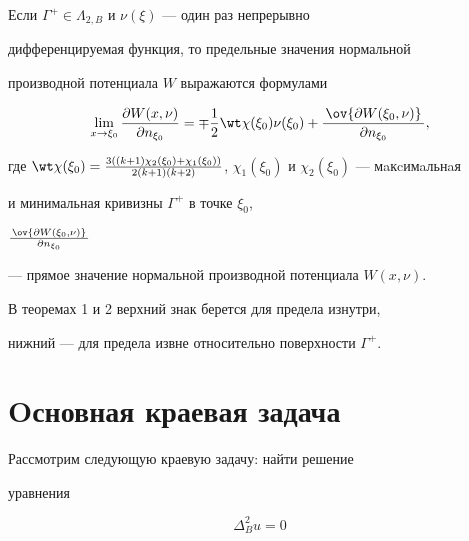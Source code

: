  


\begin{thm} 


Если $\Gamma^+\in\Lambda_{2,B}$ и $\nu(\xi)$ --- один раз непрерывно 


дифференцируемая функция, то предельные значения нормальной 


производной потенциала $W$ выражаются формулами 


\begin{equation} 


\lim_{x\to\xi_0}\frac{\partial W(x,\nu)}{\partial n_{\xi_0}}= 


\mp\frac{1}{2}\wt\chi(\xi_0)\nu(\xi_0)+ 


\frac{\,\ov{\partial W(\xi_0,\nu)}\,}{\partial n_{\xi_0}}, 


\end{equation} 


где $\wt\chi(\xi_0)=\frac{3((k+1)\chi_2(\xi_0)+\chi_1(\xi_0))} 


{2(k+1)(k+2)}$, $\chi_1(\xi_0)$ и $\chi_2(\xi_0)$ --- мaкcимaльнaя 


и минимальная кривизны $\Gamma^+$ в точке $\xi_0$, 


$\frac{\,\ov{\partial W(\xi_0,\nu)}\,}{\partial n_{\xi_0}}$ 


--- прямое значение нормальной производной потенциала $W(x,\nu)$. 


\end{thm} 


 


В теоремах 1 и 2 верхний знак берется для предела изнутри, 


нижний --- для предела извне относительно поверхности $\Gamma^+$. 


 


\section{Oсновная краевая задача} 


 


Рассмотрим следующую краевую задачу: найти решение 


уравнения 


\begin{equation} 


\Delta^2_B u=0 


\end{equation} 


